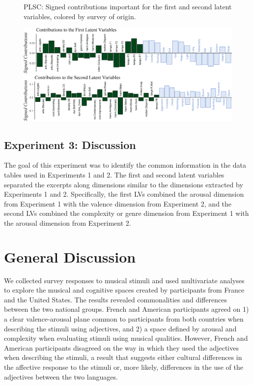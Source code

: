 \documentclass[
  english,
  man,floatsintext]{apa6}
\begin{document}
\begin{figure}   
  \centering  
  \caption{PLSC: Signed contributions important for the first and second latent variables, colored by survey of origin.}
    \includegraphics{./Music-Descriptor-Space_files/figure-latex/contsplsccode-1.png}
  \label{fig:contsplsc}
  \caption*{}
\end{figure}

\hypertarget{experiment-3-discussion}{%
\subsection{Experiment 3: Discussion}\label{experiment-3-discussion}}

The goal of this experiment was to identify the common information in the data tables used in Experiments 1 and 2. The first and second latent variables separated the excerpts along dimensions similar to the dimensions extracted by Experiments 1 and 2. Specifically, the first LVs combined the arousal dimension from Experiment 1 with the valence dimension from Experiment 2, and the second LVs combined the complexity or genre dimension from Experiment 1 with the arousal dimension from Experiment 2.

\hypertarget{general-discussion}{%
\section{General Discussion}\label{general-discussion}}

We collected survey responses to musical stimuli and used multivariate analyses to explore the musical and cognitive spaces created by participants from France and the United States. The results revealed commonalities and differences between the two national groups. French and American participants agreed on 1) a clear valence-arousal plane common to participants from both countries when describing the stimuli using adjectives, and 2) a space defined by arousal and complexity when evaluating stimuli using musical qualities. However, French and American participants disagreed on the way in which they used the adjectives when describing the stimuli, a result that suggests either cultural differences in the affective response to the stimuli or, more likely, differences in the use of the adjectives between the two languages.
\end{document}
